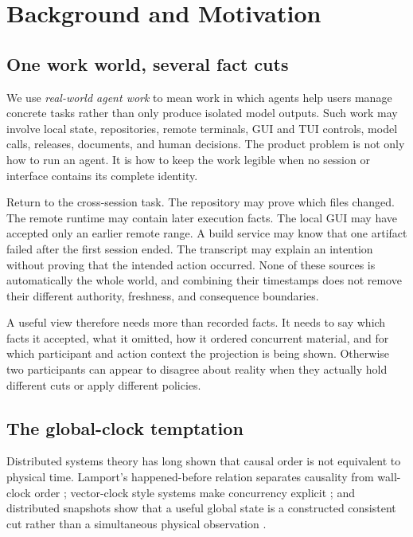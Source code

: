 \section{Background and Motivation}
\label{sec:background}

\subsection{One work world, several fact cuts}

We use \emph{real-world agent work} to mean work in which agents help users
manage concrete tasks rather than only produce isolated model outputs. Such
work may involve local state, repositories, remote terminals, GUI and TUI
controls, model calls, releases, documents, and human decisions. The product
problem is not only how to run an agent. It is how to keep the work legible
when no session or interface contains its complete identity.

Return to the cross-session task. The repository may prove which files changed.
The remote runtime may contain later execution facts. The local GUI may have
accepted only an earlier remote range. A build service may know that one
artifact failed after the first session ended. The transcript may explain an
intention without proving that the intended action occurred. None of these
sources is automatically the whole world, and combining their timestamps does
not remove their different authority, freshness, and consequence boundaries.

A useful view therefore needs more than recorded facts. It needs to say which
facts it accepted, what it omitted, how it ordered concurrent material, and for
which participant and action context the projection is being shown. Otherwise
two participants can appear to disagree about reality when they actually hold
different cuts or apply different policies.

\subsection{The global-clock temptation}

Distributed systems theory has long shown that causal order is not equivalent
to physical time. Lamport's happened-before relation separates causality from
wall-clock order \cite{lamport1978time}; vector-clock style systems make
concurrency explicit \cite{mattern1989virtual}; and distributed snapshots show
that a useful global state is a constructed consistent cut rather than a
simultaneous physical observation \cite{chandy1985snapshots}.

